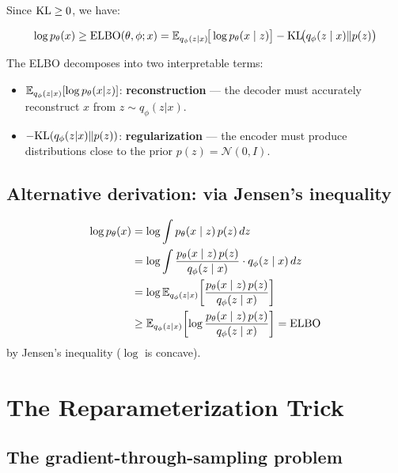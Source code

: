 Since $\mathrm{KL} \geq 0$, we have:

\begin{mathbox}[title=\textbf{Evidence Lower Bound (ELBO)}]
\begin{equation}
\log p_\theta(x) \geq \text{ELBO}(\theta, \phi; x) = \mathbb{E}_{q_\phi(z|x)}\!\big[\log p_\theta(x \mid z)\big] - \mathrm{KL}\!\big(q_\phi(z \mid x) \| p(z)\big)
\label{eq:elbo}
\end{equation}
\end{mathbox}

\begin{intuition}
The ELBO decomposes into two interpretable terms:
\begin{itemize}
    \item $\mathbb{E}_{q_\phi(z|x)}[\log p_\theta(x|z)]$: \textbf{reconstruction} --- the decoder must accurately reconstruct $x$ from $z \sim q_\phi(z|x)$.
    \item $-\mathrm{KL}(q_\phi(z|x) \| p(z))$: \textbf{regularization} --- the encoder must produce distributions close to the prior $p(z) = \mathcal{N}(0, I)$.
\end{itemize}
\end{intuition}

\subsection{Alternative derivation: via Jensen's inequality}

\begin{proposition}
\begin{align}
\log p_\theta(x) &= \log \int p_\theta(x \mid z)\, p(z)\, dz \\
&= \log \int \frac{p_\theta(x \mid z)\, p(z)}{q_\phi(z \mid x)} \cdot q_\phi(z \mid x)\, dz \\
&= \log \mathbb{E}_{q_\phi(z|x)}\!\left[\frac{p_\theta(x \mid z)\, p(z)}{q_\phi(z \mid x)}\right] \\
&\geq \mathbb{E}_{q_\phi(z|x)}\!\left[\log \frac{p_\theta(x \mid z)\, p(z)}{q_\phi(z \mid x)}\right] = \text{ELBO}
\end{align}
by Jensen's inequality ($\log$ is concave).
\end{proposition}

\section{The Reparameterization Trick}
\label{sec:reparam-trick}

\subsection{The gradient-through-sampling problem}

